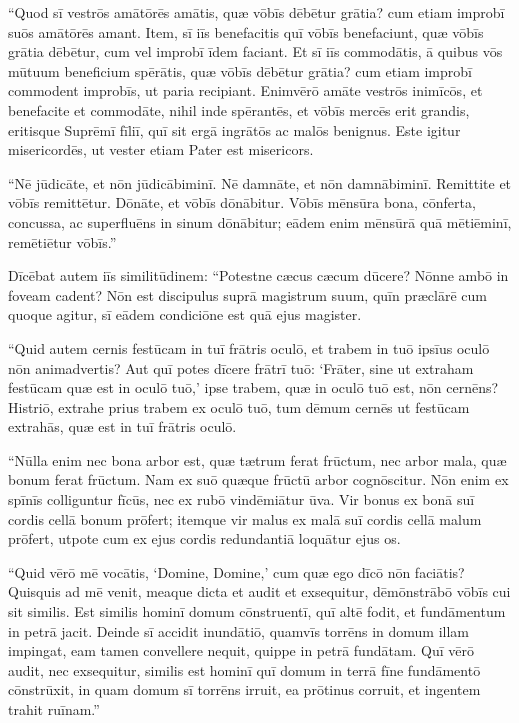 \Versus ``Quod sī vestrōs amātōrēs amātis, quæ vōbīs dēbētur grātia? cum etiam improbī suōs amātōrēs amant.
\Versus Item, sī iīs benefacitis quī vōbīs benefaciunt, quæ vōbīs grātia dēbētur, cum vel improbī īdem faciant.
\Versus Et sī iīs commodātis, ā quibus vōs mūtuum beneficium spērātis, quæ vōbīs dēbētur grātia? cum etiam improbī commodent improbīs, ut paria recipiant.
\Versus Enimvērō amāte vestrōs inimīcōs, et benefacite et commodāte, nihil inde spērantēs, et vōbīs mercēs erit grandis, eritisque Suprēmī fīliī, quī sit ergā ingrātōs ac malōs benignus.
\Versus Este igitur misericordēs, ut vester etiam Pater est misericors.

\Versus ``Nē jūdicāte, et nōn jūdicābiminī. Nē damnāte, et nōn damnābiminī. Remittite et vōbīs remittētur.
\Versus Dōnāte, et vōbīs dōnābitur. Vōbīs mēnsūra bona, cōnferta, concussa, ac superfluēns in sinum dōnābitur; eādem enim mēnsūrā quā mētiēminī, remētiētur vōbīs.''

\Versus Dīcēbat autem iīs similitūdinem: ``Potestne cæcus cæcum dūcere? Nōnne ambō in foveam cadent?
\Versus Nōn est discipulus suprā magistrum suum, quīn præclārē cum quoque agitur, sī eādem condiciōne est quā ejus magister.

\Versus ``Quid autem cernis festūcam in tuī frātris oculō, et trabem in tuō ipsīus oculō nōn animadvertis?
\Versus Aut quī potes dīcere frātrī tuō: `Frāter, sine ut extraham festūcam quæ est in oculō tuō,' ipse trabem, quæ in oculō tuō est, nōn cernēns? Histriō, extrahe prius trabem ex oculō tuō, tum dēmum cernēs ut festūcam extrahās, quæ est in tuī frātris oculō.

\Versus ``Nūlla enim nec bona arbor est, quæ tætrum ferat frūctum, nec arbor mala, quæ bonum ferat frūctum.
\Versus Nam ex suō quæque frūctū arbor cognōscitur. Nōn enim ex spīnīs colliguntur fīcūs, nec ex rubō vindēmiātur ūva.
\Versus Vir bonus ex bonā suī cordis cellā bonum prōfert; itemque vir malus ex malā suī cordis cellā malum prōfert, utpote cum ex ejus cordis redundantiā loquātur ejus os.

\Versus ``Quid vērō mē vocātis, `Domine, Domine,' cum quæ ego dīcō nōn faciātis?
\Versus Quis\-quis ad mē venit, meaque dicta et audit et exsequitur, dēmōnstrābō vōbīs cui sit similis.
\Versus Est similis hominī domum cōnstruentī, quī altē fodit, et fundāmentum in petrā jacit. Deinde sī accidit inundātiō, quamvīs torrēns in domum illam impingat, eam tamen convellere nequit, quippe in petrā fundātam.
\Versus Quī vērō audit, nec exsequitur, similis est hominī quī domum in terrā fīne fundāmentō cōnstrūxit, in quam domum sī torrēns irruit, ea prōtinus corruit, et ingentem trahit ruīnam.''


